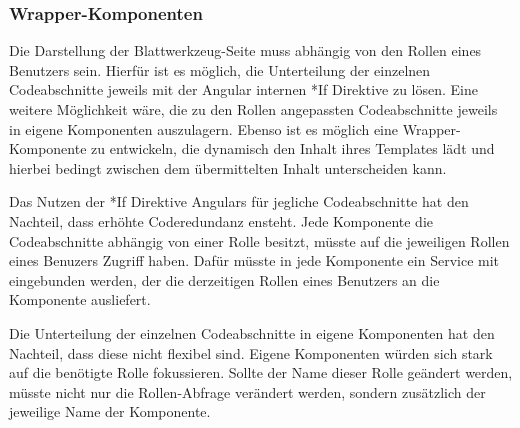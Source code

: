 \subsubsection{Wrapper-Komponenten}
\label{sec:client-wrapper-components}
Die Darstellung der Blattwerkzeug-Seite muss abhängig von den Rollen eines Benutzers sein. Hierfür ist es möglich, die Unterteilung der einzelnen Codeabschnitte jeweils mit der Angular internen *If Direktive zu lösen. Eine weitere Möglichkeit wäre, die zu den Rollen angepassten Codeabschnitte jeweils in eigene Komponenten auszulagern. Ebenso ist es möglich eine Wrapper-Komponente zu entwickeln, die dynamisch den Inhalt ihres Templates lädt und hierbei bedingt zwischen dem übermittelten Inhalt unterscheiden kann.

Das Nutzen der *If Direktive Angulars für jegliche Codeabschnitte hat den Nachteil, dass erhöhte Coderedundanz ensteht. Jede Komponente die Codeabschnitte abhängig von einer Rolle besitzt, müsste auf die jeweiligen Rollen eines Benuzers Zugriff haben. Dafür müsste in jede Komponente ein Service mit eingebunden werden, der die derzeitigen Rollen eines Benutzers an die Komponente ausliefert.

Die Unterteilung der einzelnen Codeabschnitte in eigene Komponenten hat den Nachteil, dass diese nicht flexibel sind. Eigene Komponenten würden sich stark auf die benötigte Rolle fokussieren. Sollte der Name dieser Rolle geändert werden, müsste nicht nur die Rollen-Abfrage verändert werden, sondern zusätzlich der jeweilige Name der Komponente.

